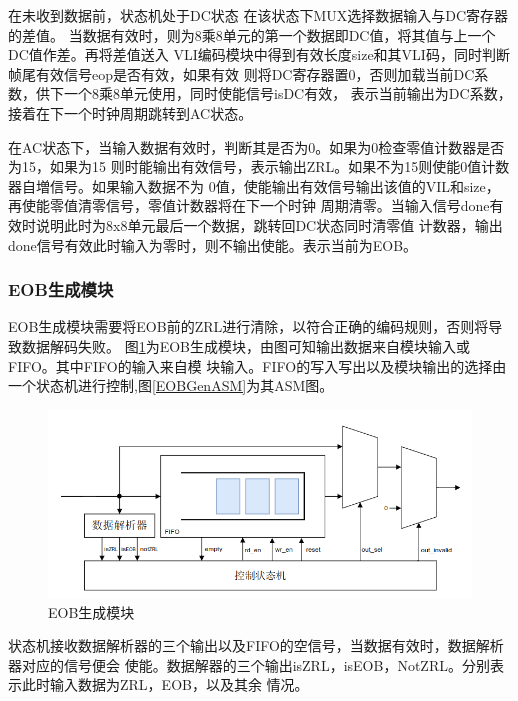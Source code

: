 \documentclass{article}
\numberwithin {equation}{section}
\begin{document}
\begin{spacing}{1.25}
      在未收到数据前，状态机处于DC状态 在该状态下MUX选择数据输入与DC寄存器的差值。
      当数据有效时，则为8乘8单元的第一个数据即DC值，将其值与上一个DC值作差。再将差值送入
      VLI编码模块中得到有效长度size和其VLI码，同时判断帧尾有效信号eop是否有效，如果有效
      则将DC寄存器置0，否则加载当前DC系数，供下一个8乘8单元使用，同时使能信号isDC有效，
      表示当前输出为DC系数，接着在下一个时钟周期跳转到AC状态。

      在AC状态下，当输入数据有效时，判断其是否为0。如果为0检查零值计数器是否为15，如果为15
      则时能输出有效信号，表示输出ZRL。如果不为15则使能0值计数器自増信号。如果输入数据不为
      0值，使能输出有效信号输出该值的VIL和size，再使能零值清零信号，零值计数器将在下一个时钟
      周期清零。当输入信号done有效时说明此时为8x8单元最后一个数据，跳转回DC状态同时清零值
      计数器，输出done信号有效此时输入为零时，则不输出使能。表示当前为EOB。

    \subsubsection{EOB生成模块}
      \vspace{1em}
      EOB生成模块需要将EOB前的ZRL进行清除，以符合正确的编码规则，否则将导致数据解码失败。
      图\ref{EOBGen}为EOB生成模块，由图可知输出数据来自模块输入或FIFO。其中FIFO的输入来自模
      块输入。FIFO的写入写出以及模块输出的选择由一个状态机进行控制,图\ref{EOBGenASM}为其ASM图。

      \begin{figure}[H]
        \centering
        \includegraphics[scale=0.6]{./pictures/EOB生成模块.png}
        \caption{EOB生成模块}
        \label{EOBGen}
      \end{figure}

      状态机接收数据解析器的三个输出以及FIFO的空信号，当数据有效时，数据解析器对应的信号便会
      使能。数据解器的三个输出isZRL，isEOB，NotZRL。分别表示此时输入数据为ZRL，EOB，以及其余
      情况。


\end{spacing}
\end{document}
